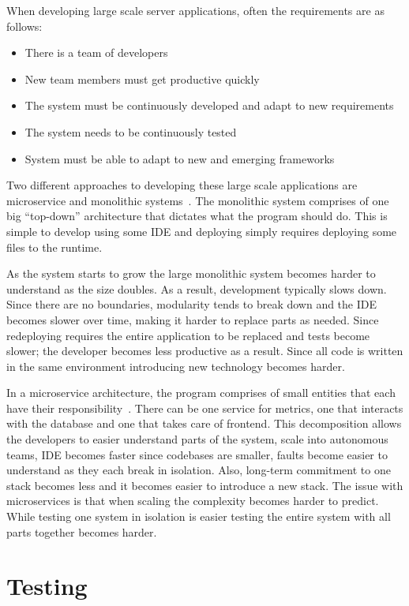 When developing large scale server applications, often the requirements are as
follows:

\begin{itemize}
    \item There is a team of developers
    \item New team members must get productive quickly
    \item The system must be continuously developed and adapt to new
        requirements
    \item The system needs to be continuously tested
    \item System must be able to adapt to new and emerging frameworks
\end{itemize}

Two different approaches to developing these large scale applications are
microservice and monolithic systems~\cite{chen2018microservices}. The monolithic
system comprises of one big ``top-down'' architecture that dictates what the
program should do. This is simple to develop using some IDE and deploying simply
requires deploying some files to the runtime. 

As the system starts to grow the large monolithic system becomes harder to
understand as the size doubles. As a result, development typically slows down.
Since there are no boundaries, modularity tends to break down and the IDE
becomes slower over time, making it harder to replace parts as needed. Since
redeploying requires the entire application to be replaced and tests become
slower; the developer becomes less productive as a result. Since all code is
written in the same environment introducing new technology becomes harder.

In a microservice architecture, the program comprises of small entities that each
have their responsibility~\cite{chenlianping}. There can be one service for
metrics, one that interacts with the database and one that takes care of
frontend. This decomposition allows the developers to easier understand parts of
the system, scale into autonomous teams, IDE becomes faster since codebases are
smaller, faults become easier to understand as they each break in isolation.
Also, long-term commitment to one stack becomes less and it becomes easier to
introduce a new stack.  The issue with microservices is that when scaling the
complexity becomes harder to predict. While testing one system in isolation is
easier testing the entire system with all parts together becomes harder.

\section{Testing}

